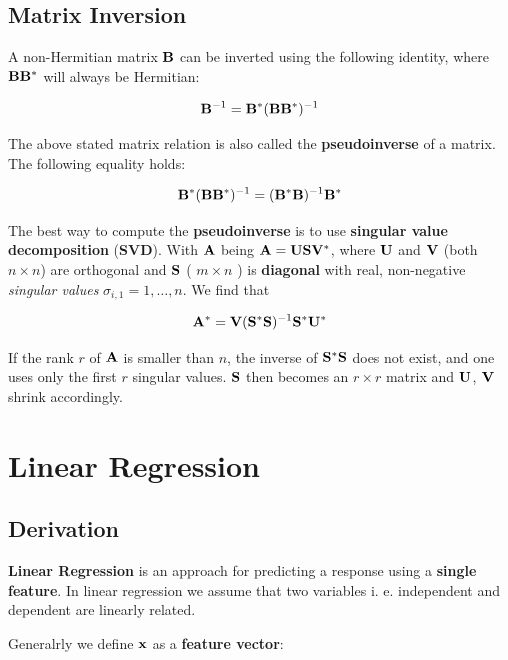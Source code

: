 \subsection{Matrix Inversion}

A non-Hermitian matrix $ \mathbf{B} $ can be inverted using the following identity,
where $ \mathbf{B} \mathbf{B}^* $ will always be Hermitian:

\begin{equation}
    \mathbf{B}^{-1} = \mathbf{B}^* ( \mathbf{B} \mathbf{B}^* )^{-1}
\end{equation}

The above stated matrix relation is also called the \textbf{pseudoinverse}
of a matrix. The following equality holds:

\begin{equation}
    \mathbf{B}^* ( \mathbf{B} \mathbf{B}^* )^{-1} = ( \mathbf{B}^* \mathbf{B} )^{-1} \mathbf{B}^*
\end{equation}

The best way to compute the \textbf{pseudoinverse} is to use
\textbf{singular value decomposition} (\textbf{SVD}). With $ \mathbf{A} $ being
$ \mathbf{A} = \mathbf{U} \mathbf{S} \mathbf{V}^* $,
where $ \mathbf{U} $ and $ \mathbf{V} $ (both $ n \times n $) are
orthogonal and
$ \mathbf{S} $ ( $ m  \times n $ ) is \textbf{diagonal} with real, non-negative
\textit{singular values} $ \sigma_{i,1} = 1, \dots, n $. We find that

\begin{equation}
    \mathbf{A}^* = \mathbf{V} ( \mathbf{S}^* \mathbf{S} )^{-1} \mathbf{S}^* \mathbf{U}^*
\end{equation}

If the rank $ r $ of $ \mathbf{A} $ is smaller than $ n $, the inverse of
$ \mathbf{S}^* \mathbf{S} $ does not exist, and one uses only the first $ r $ singular
values. $ \mathbf{S} $ then becomes an $ r \times r $ matrix and $ \mathbf{U}$, $ \mathbf{V} $
shrink accordingly.


\section{Linear Regression}
\subsection{Derivation}

\textbf{Linear Regression} is an approach for predicting a response using
a \textbf{single feature}. In linear regression we assume that two variables
i. e. independent and dependent are linearly related.

Generalrly we define $ \mathbf{x} $ as a \textbf{feature vector}:

